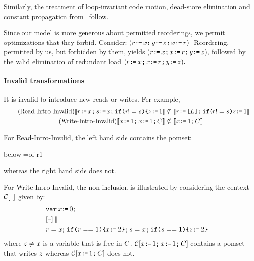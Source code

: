 Similarly, the treatment of loop-invariant code motion, dead-store
elimination and constant propagation
from~\citet{Dolan:2018:BDR:3192366.3192421} follow.

Since
our model is more generous about permitted reorderings, we permit
optimizations that they forbid.  Consider:
\begin{math}
  (r \texttt{:}\mkern-1mu\texttt{=}\, x \texttt{;}\,\allowbreak y \texttt{:}\mkern-1mu\texttt{=}\, z  \texttt{;}\,\allowbreak x \texttt{:}\mkern-1mu\texttt{=}\, r).
\end{math}
Reordering, permitted by us, but forbidden by them, yields
\begin{math}
  (r \texttt{:}\mkern-1mu\texttt{=}\, x \texttt{;}\,\allowbreak x \texttt{:}\mkern-1mu\texttt{=}\, r \texttt{;}\,\allowbreak y \texttt{:}\mkern-1mu\texttt{=}\, z),
\end{math}
followed by the valid elimination of redundant load
\begin{math}
  (r \texttt{:}\mkern-1mu\texttt{=}\, x \texttt{;}\,\allowbreak x \texttt{:}\mkern-1mu\texttt{=}\, r \texttt{;}\,\allowbreak y \texttt{:}\mkern-1mu\texttt{=}\, z).
\end{math}

\paragraph*{Invalid transformations}
It is invalid to introduce new reads or writes.  For example, 
\begin{align*}
    \tag{Read-Intro-Invalid}
\llbracket r \texttt{:}\mkern-1mu\texttt{=}\, x \texttt{;}\,\allowbreak s \texttt{:}\mkern-1mu\texttt{=}\, x  \texttt{;}\,\allowbreak 
\texttt{if}\allowbreak\texttt{(}r != s\texttt{)} \allowbreak\texttt{\{} z \texttt{:}\mkern-1mu\texttt{=}\, 1\rrbracket &\not\subseteq
  \llbracket r \texttt{:}\mkern-1mu\texttt{=}\, \texttt{[}L\texttt{]} \texttt{;}\,\allowbreak \texttt{if}\allowbreak\texttt{(}r != s\texttt{)} z \texttt{:}\mkern-1mu\texttt{=}\, 1\rrbracket \\
    \tag{Write-Intro-Invalid}
\llbracket x \texttt{:}\mkern-1mu\texttt{=}\, 1 \texttt{;}\,\allowbreak x \texttt{:}\mkern-1mu\texttt{=}\, 1 \texttt{;}\,\allowbreak C\rrbracket &\not\subseteq
  \llbracket x \texttt{:}\mkern-1mu\texttt{=}\, 1 \texttt{;}\,\allowbreak C\rrbracket \\
\end{align*}

For Read-Intro-Invalid, the left hand side contains the pomset:
\begin{tikzdisplay}[node distance=1em]
   {below =of r1}
\end{tikzdisplay}
whereas the right hand side does not.

For Write-Intro-Invalid, the non-inclusion is illustrated by considering the context  $\aCtxt\hole{}$ given by:
\begin{align*}
& \VAR \aLoc \GETS 0 \SEMI \\
& \hole{} \PAR \\
&  \aReg = \aLoc \SEMI  \IF{\aReg == 1} \THEN \aLoc \GETS 2 \FI  \SEMI  \bReg = \aLoc \SEMI  \IF{\bReg == 1} \THEN \cLoc \GETS 2 \FI
\end{align*}
where $z \not=x$ is a variable that is free in $C$.  
$\aCtxt\hole{\aLoc \GETS 1 \SEMI \aLoc \GETS 1 \SEMI \aCmd}$ contains a pomset that writes $z$ whereas 
$\aCtxt\hole{\aLoc \GETS 1 \SEMI \aCmd}$  does not.

